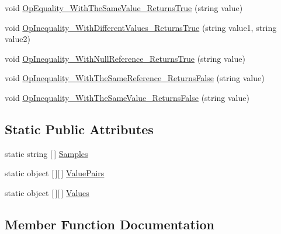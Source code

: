 \begin{DoxyCompactItemize}
\item 
void \mbox{\hyperlink{class_markov_1_1_tests_1_1_chain_state_tests_af5c431448228c72446da26c4b43f09bc}{Op\+Equality\+\_\+\+With\+The\+Same\+Value\+\_\+\+Returns\+True}} (string value)
\item 
void \mbox{\hyperlink{class_markov_1_1_tests_1_1_chain_state_tests_a2206cf4056184bee3f3a228b9f6da5e7}{Op\+Inequality\+\_\+\+With\+Different\+Values\+\_\+\+Returns\+True}} (string value1, string value2)
\item 
void \mbox{\hyperlink{class_markov_1_1_tests_1_1_chain_state_tests_a6789f7656ecaee08a77399ba14aa9f72}{Op\+Inequality\+\_\+\+With\+Null\+Reference\+\_\+\+Returns\+True}} (string value)
\item 
void \mbox{\hyperlink{class_markov_1_1_tests_1_1_chain_state_tests_a8fc9b1913bd953585a0822bea1ecad17}{Op\+Inequality\+\_\+\+With\+The\+Same\+Reference\+\_\+\+Returns\+False}} (string value)
\item 
void \mbox{\hyperlink{class_markov_1_1_tests_1_1_chain_state_tests_a5edd5e8df76165cd14cb238dc6d80459}{Op\+Inequality\+\_\+\+With\+The\+Same\+Value\+\_\+\+Returns\+False}} (string value)
\end{DoxyCompactItemize}
\subsection*{Static Public Attributes}
\begin{DoxyCompactItemize}
\item 
static string \mbox{[}$\,$\mbox{]} \mbox{\hyperlink{class_markov_1_1_tests_1_1_chain_state_tests_ab07b0e6dcc3273b5cd6321278394e79f}{Samples}}
\item 
static object \mbox{[}$\,$\mbox{]}\mbox{[}$\,$\mbox{]} \mbox{\hyperlink{class_markov_1_1_tests_1_1_chain_state_tests_a6f995526349802f9aeb21d1f754727c4}{Value\+Pairs}}
\item 
static object \mbox{[}$\,$\mbox{]}\mbox{[}$\,$\mbox{]} \mbox{\hyperlink{class_markov_1_1_tests_1_1_chain_state_tests_a057932abae5917bee396f427da7c8262}{Values}}
\end{DoxyCompactItemize}


\subsection{Member Function Documentation}
\mbox{\label{class_markov_1_1_tests_1_1_chain_state_tests_a1732c1d9f5264c4b3a4f7db62c382887}} 

